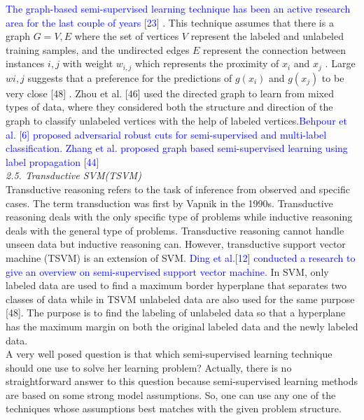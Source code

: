 \documentclass{article}
\begin{document}
		\textcolor{blue}{The graph-based semi-supervised learning technique has been an active research area for the last couple of years [23] \cite{montero2007role}.} This technique assumes that there is a graph $G = {V, E}$ where the set of vertices $V$ represent the labeled and unlabeled training samples, and the undirected edges $E$ represent the connection between
		instances $i, j$ with weight $w_{i,j}$ which represents the proximity of $x_i$ and $x_j$ . Large $wi,j$ suggests that a preference for the predictions of $g(x_i)$ and $g(x_j)$ to be very close [48] \cite{yager1980measure}. Zhou et al. [46] used the directed
		graph to learn from mixed types of data, where they considered both the structure and direction of the graph
		to classify unlabeled vertices with the help of labeled vertices.\textcolor{blue}{Behpour et al. [6] proposed adversarial robust 
			cuts for semi-supervised and multi-label classification. Zhang et al. proposed graph based semi-supervised
			learning using label propagation [44] \cite{ashfaq2017fuzziness}}\\[10pt]
		\textit{ 2.5. Transductive SVM(TSVM)}\\
		
		Transductive reasoning refers to the task of inference from observed and specific cases. The term transduction was first by Vapnik in the 1990s. Transductive reasoning deals with the only specific 
		\newpage type of problems while inductive reasoning deals with the general type of problems. Transductive reasoning
		cannot handle unseen data but inductive reasoning can. However, transductive support vector machine
		(TSVM) is an extension of SVM.\textcolor{blue}{ Ding et al.[12] conducted a research to give an overview on
			semi-supervised support vector machine.} In SVM, only labeled data are used to find a maximum border hyperplane that
		separates two classes of data while in TSVM unlabeled data are also used for the same purpose [48]. The
		purpose is to find the labeling of unlabeled data so that a hyperplane has the maximum margin on both the
		original labeled data and the newly labeled data.\\
		
		A very well posed question is that which semi-supervised learning technique should one use to solve her
		learning problem? Actually, there is no straightforward answer to this question because semi-supervised
		learning methods are based on some strong model assumptions. So, one can use any one of the techniques
		whose assumptions best matches with the given problem structure.\\[5pt]
		
\end{document}
